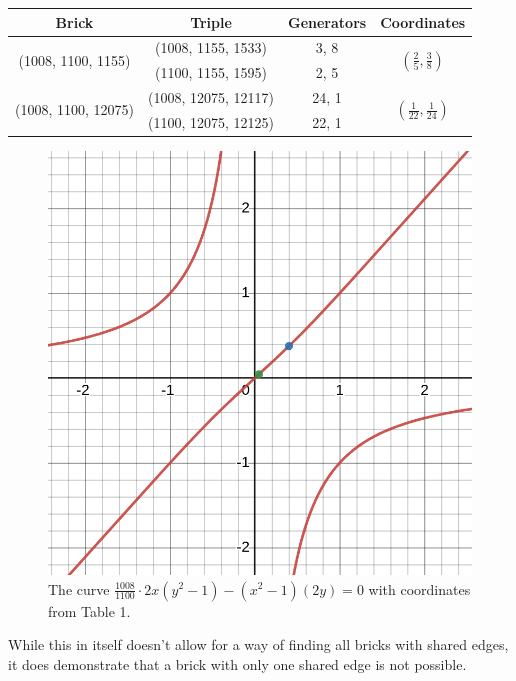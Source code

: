 \documentclass[11pt]{article}
\begin{document}
\begin{table}[H]
	\begin{tabular}{| c | c | c | c |}
		\hline
		Brick & Triple & Generators & Coordinates\\
		\hline \hline 
		\multirow{2}{*}{(1008, 1100, 1155)} & (1008, 1155, 1533) & {3, 8} & \multirow{2}{*}{$(\frac{2}{5}, \frac{3}{8})$} \\ \cline{2-3}
		& (1100, 1155, 1595) & {2, 5} & \\ \hline
		\multirow{2}{*}{(1008, 1100, 12075)} & (1008, 12075, 12117) & {24, 1} & \multirow{2}{*}{$(\frac{1}{22}, \frac{1}{24})$} \\ \cline{2-3}
		& (1100, 12075, 12125) & {22, 1} & \\ \hline
	\end{tabular}
\end{table}
\begin{figure}[h]
	\centering
	\includegraphics[scale=0.25]{3.png}
	\caption{The curve $\frac{1008}{1100}\cdot2x(y^2-1)-(x^2-1)(2y)=0$ with coordinates from Table 1.}
\end{figure}

While this in itself doesn't allow for a way of finding all bricks with shared edges, it does demonstrate that a brick with only one shared edge is not possible. 
\end{document}
